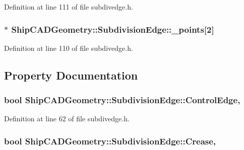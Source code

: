 Definition at line 111 of file subdivedge.\-h.

\hypertarget{classShipCADGeometry_1_1SubdivisionEdge_a1df486b149723fe19190b178897f9a27}{
\subsubsection[{\-\_\-points}]{$\ast$ Ship\-C\-A\-D\-Geometry\-::\-Subdivision\-Edge\-::\-\_\-points\mbox{[}2\mbox{]}\hspace{0.3cm}{\ttfamily [protected]}}}\label{classShipCADGeometry_1_1SubdivisionEdge_a1df486b149723fe19190b178897f9a27}


Definition at line 110 of file subdivedge.\-h.



\subsection{Property Documentation}
\hypertarget{classShipCADGeometry_1_1SubdivisionEdge_a2b11b00bcc223691e6e00c4b8db272b6}{
\subsubsection[{Control\-Edge}]{\setlength{\rightskip}{0pt plus 5cm}bool Ship\-C\-A\-D\-Geometry\-::\-Subdivision\-Edge\-::\-Control\-Edge\hspace{0.3cm}{\ttfamily [read]}, {\ttfamily [write]}}}\label{classShipCADGeometry_1_1SubdivisionEdge_a2b11b00bcc223691e6e00c4b8db272b6}


Definition at line 62 of file subdivedge.\-h.

\hypertarget{classShipCADGeometry_1_1SubdivisionEdge_ab36f0260a63d4ca62c45feddf96f8505}{
\subsubsection[{Crease}]{\setlength{\rightskip}{0pt plus 5cm}bool Ship\-C\-A\-D\-Geometry\-::\-Subdivision\-Edge\-::\-Crease\hspace{0.3cm}{\ttfamily [read]}, {\ttfamily [write]}}}\label{classShipCADGeometry_1_1SubdivisionEdge_ab36f0260a63d4ca62c45feddf96f8505}


